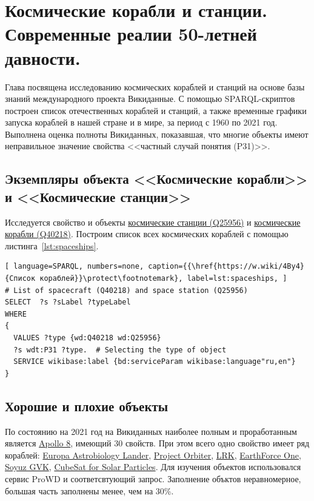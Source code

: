 \chapter{Космические корабли и станции. Современные реалии 50-летней давности.}
\label{ch:spacecraft-space-station}

Глава посвящена исследованию космических кораблей и станций на основе базы знаний международного проекта Викиданные. С помощью SPARQL-скриптов построен список отечественных кораблей и станций, а также временные графики запуска кораблей в нашей стране и в мире, за период с 1960 по 2021 год. Выполнена оценка полноты Викиданных, показавшая, что многие объекты имеют неправильное значение свойства <<частный случай понятия (P31)>>.
\section{Экземпляры объекта <<Космические корабли>> и <<Космические станции>>}
Исследуется свойство  и объекты \href{https://www.wikidata.org/wiki/Q25956}{космические станции (Q25956)} и \href{https://www.wikidata.org/wiki/Q40218}{космические корабли (Q40218)}.
Построим список всех космических кораблей с помощью листинга~\ref{lst:spaceships}.

\begin{lstlisting}[ language=SPARQL, numbers=none, caption={{\href{https://w.wiki/4By4}{Список кораблей}}\protect\footnotemark}, label=lst:spaceships, ]
# List of spacecraft (Q40218) and space station (Q25956)
SELECT  ?s ?sLabel ?typeLabel
WHERE
{
  VALUES ?type {wd:Q40218 wd:Q25956}
  ?s wdt:P31 ?type.  # Selecting the type of object
  SERVICE wikibase:label {bd:serviceParam wikibase:language"ru,en"}
}
\end{lstlisting}
\section{Хорошие и плохие объекты}
По состоянию на 2021 год на Викиданных наиболее полным и проработанным является \href{ https://www.wikidata.org/wiki/Q184201}{Apollo 8}, имеющий 30 свойств\autocite{spacecraftProWD}.
При этом всего одно свойство имеет ряд кораблей: \href{https://www.wikidata.org/wiki/Q10491365}{ Europa Astrobiology Lander}, \href{https://www.wikidata.org/wiki/Q6514453 }{ Project Orbiter}, \href{https://www.wikidata.org/wiki/Q5961734 }{ LRK}, \href{https://www.wikidata.org/wiki/Q5327028 }{ EarthForce One}, \href{https://www.wikidata.org/wiki/Q60767924 }{ Soyuz GVK}, \href{https://www.wikidata.org/wiki/Q22907583 }{ CubeSat for Solar Particles}\autocite{spacecraftProWD}.
Для изучения объектов использовался сервис ProWD и соответсвтующий {{запрос}\protect\footnotemark}. Заполнение объктов неравномерное, большая часть заполнены менее, чем на 30\%\autocite{spacecraftProWD}. 

